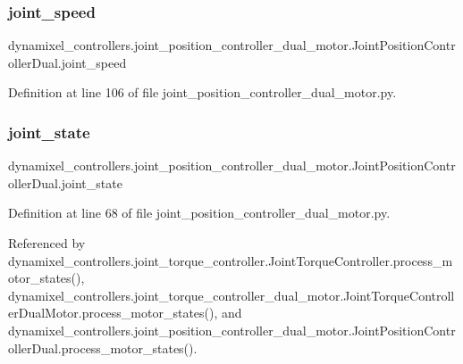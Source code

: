\subsubsection{\texorpdfstring{joint\+\_\+speed}{joint\_speed}}
{\footnotesize\ttfamily dynamixel\+\_\+controllers.\+joint\+\_\+position\+\_\+controller\+\_\+dual\+\_\+motor.\+Joint\+Position\+Controller\+Dual.\+joint\+\_\+speed}



Definition at line 106 of file joint\+\_\+position\+\_\+controller\+\_\+dual\+\_\+motor.\+py.

\mbox{\label{classdynamixel__controllers_1_1joint__position__controller__dual__motor_1_1_joint_position_controller_dual_aea6a9357dca35e4bc742d3e5ac59c8ce}} 
\subsubsection{\texorpdfstring{joint\+\_\+state}{joint\_state}}
{\footnotesize\ttfamily dynamixel\+\_\+controllers.\+joint\+\_\+position\+\_\+controller\+\_\+dual\+\_\+motor.\+Joint\+Position\+Controller\+Dual.\+joint\+\_\+state}



Definition at line 68 of file joint\+\_\+position\+\_\+controller\+\_\+dual\+\_\+motor.\+py.



Referenced by dynamixel\+\_\+controllers.\+joint\+\_\+torque\+\_\+controller.\+Joint\+Torque\+Controller.\+process\+\_\+motor\+\_\+states(), dynamixel\+\_\+controllers.\+joint\+\_\+torque\+\_\+controller\+\_\+dual\+\_\+motor.\+Joint\+Torque\+Controller\+Dual\+Motor.\+process\+\_\+motor\+\_\+states(), and dynamixel\+\_\+controllers.\+joint\+\_\+position\+\_\+controller\+\_\+dual\+\_\+motor.\+Joint\+Position\+Controller\+Dual.\+process\+\_\+motor\+\_\+states().

